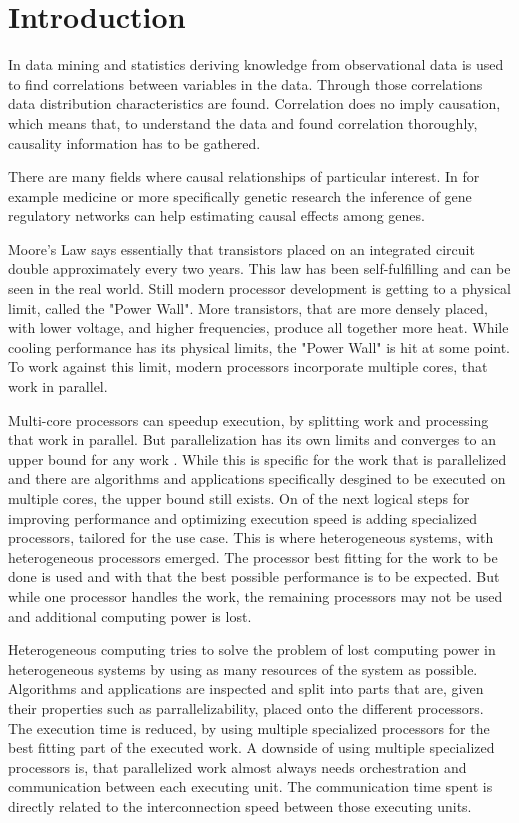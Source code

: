 \chapter{Introduction}
In data mining and statistics deriving knowledge from observational data is used to find correlations between variables in the data. Through those correlations data distribution characteristics are found. Correlation does no imply causation, which means that, to understand the data and found correlation thoroughly, causality information has to be gathered.

There are many fields where causal relationships of particular interest. In for example medicine or more specifically genetic research the inference of gene regulatory networks can help estimating causal effects among genes. \cite{rauJointEstimationCausal2013}

Moore's Law \cite{mooreCrammingMoreComponents1965} says essentially that transistors placed on an integrated circuit double approximately every two years. This law has been self-fulfilling and can be seen in the real world. Still modern processor development is getting to a physical limit, called the "Power Wall". More transistors, that are more densely placed, with lower voltage, and higher frequencies, produce all together more heat. While cooling performance has its physical limits, the "Power Wall" is hit at some point. To work against this limit, modern processors incorporate multiple cores, that work in parallel.

Multi-core processors can speedup execution, by splitting work and processing that work in parallel. But parallelization has its own limits and converges to an upper bound for any work \cite{amdahlValiditySingleProcessor1967}. While this is specific for the work that is parallelized and there are algorithms and applications specifically desgined to be executed on multiple cores, the upper bound still exists. On of the next logical steps for improving performance and optimizing execution speed is adding specialized processors, tailored for the use case. This is where heterogeneous systems, with heterogeneous processors emerged. The processor best fitting for the work to be done is used and with that the best possible performance is to be expected. But while one processor handles the work, the remaining processors may not be used and additional computing power is lost.

Heterogeneous computing tries to solve the problem of lost computing power in heterogeneous systems by using as many resources of the system as possible. Algorithms and applications are inspected and split into parts that are, given their properties such as parrallelizability, placed onto the different processors. The execution time is reduced, by using multiple specialized processors for the best fitting part of the executed work. A downside of using multiple specialized processors is, that parallelized work almost always needs orchestration and communication between each executing unit. The communication time spent is directly related to the interconnection speed between those executing units.

